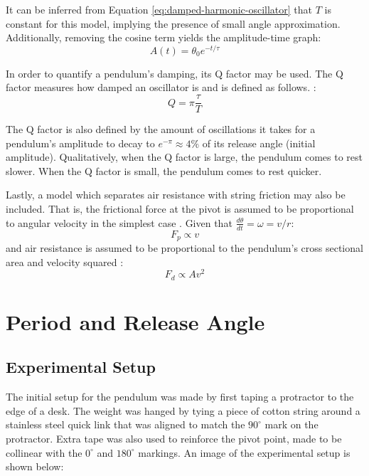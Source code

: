 \documentclass[11pt]{article}
\begin{document}
\begin{multicols}{2}
It can be inferred from Equation \ref{eq:damped-harmonic-oscillator} that $T$ is constant for this model, implying the presence of small angle approximation. Additionally, removing the cosine term yields the amplitude-time graph:
\begin{equation} \label{eq:amplitude-function}
    A(t) = \theta_0 e^{-{t/\tau}}
\end{equation}

In order to quantify a pendulum's damping, its Q factor may be used. The Q factor measures how damped an oscillator is and is defined as follows. \cite{pnp-physics}:
\begin{equation} \label{eq:q-factor-formula}
    Q = \pi\frac{\tau}{T}
\end{equation}

The Q factor is also defined by the amount of oscillations it takes for a pendulum's amplitude to decay to $e^{-\pi} \approx 4\%$ of its release angle (initial amplitude). Qualitatively, when the Q factor is large, the pendulum comes to rest slower. When the Q factor is small, the pendulum comes to rest quicker.

Lastly, a model which separates air resistance with string friction may also be included. That is, the frictional force at the pivot is assumed to be proportional to angular velocity in the simplest case \cite{duke-pendulum}. Given that $\frac{d\theta}{dt} = \omega = v/r$:
\begin{equation} \label{eq:propto v}
    F_p \propto v
\end{equation}
and air resistance is assumed to be proportional to the pendulum's cross sectional area and velocity squared \cite{airdrag}:
\begin{equation} \label{eq:propto v2}
    F_d \propto Av^2
\end{equation}

\section{Period and Release Angle} \label{sec 3 period and release angle}

\subsection{Experimental Setup}
The initial setup for the pendulum was made by first taping a protractor to the edge of a desk. The weight was hanged by tying a piece of cotton string around a stainless steel quick link that was aligned to match the $90^{\circ}$ mark on the protractor. Extra tape was also used to reinforce the pivot point, made to be collinear with the $0^{\circ}$ and $180^{\circ}$ markings. An image of the experimental setup is shown below:


\end{multicols}
\end{document}
